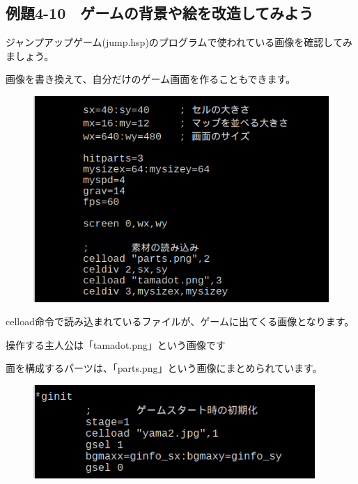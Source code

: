 \newpage
\subsection{例題4-10　ゲームの背景や絵を改造してみよう}


\begin{description}
    \item {}
\end{description}

ジャンプアップゲーム(jump.hsp)のプログラムで使われている画像を確認してみましょう。

画像を書き換えて、自分だけのゲーム画面を作ることもできます。

\begin{figure}[H]
    \begin{center}
      \includegraphics[keepaspectratio]{text04-img/s_jumpsrcpart.png}
    \end{center}
    \label{fig:prog_menu}
\end{figure}

celload命令で読み込まれているファイルが、ゲームに出てくる画像となります。

操作する主人公は「tamadot.png」という画像です

面を構成するパーツは、「parts.png」という画像にまとめられています。

\begin{figure}[H]
    \begin{center}
      \includegraphics[keepaspectratio,width=10.689cm,height=3.538cm]{text04-img/s_jumpbackgroundsrc.png}
    \end{center}
    \label{fig:prog_menu}
\end{figure}

